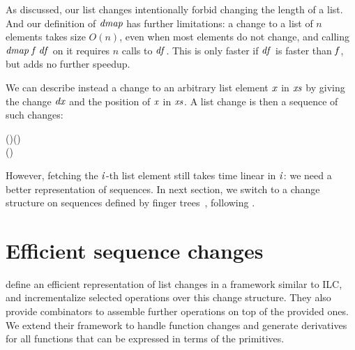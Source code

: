 As discussed, our list changes intentionally forbid changing the length of a list.
And our definition of \ensuremath{\Varid{dmap}} has further limitations: a change to a list of $n$
elements takes size $O(n)$, even when most elements do not change, and calling
\ensuremath{\Varid{dmap}\;\Varid{f}\;\Varid{df}} on it requires $n$ calls to \ensuremath{\Varid{df}}. This is only faster if \ensuremath{\Varid{df}} is
faster than \ensuremath{\Varid{f}}, but adds no further speedup.

We can describe instead a change to an arbitrary list element \ensuremath{\Varid{x}} in \ensuremath{\Varid{xs}} by
giving the change \ensuremath{\Varid{dx}} and the position of \ensuremath{\Varid{x}} in \ensuremath{\Varid{xs}}. A list change is then a
sequence of such changes:
\begin{hscode}\SaveRestoreHook
{}%
%
\>[B]{}\;\Delta (\;)\mathrel{=}\;(\;){}\<[E]%
\\
\>[B]{}\;\;\mathrel{=}\;\;(\Delta {}){}\<[E]%
\ColumnHook
\end{hscode}\resethooks
However, fetching the \ensuremath{\Varid{i}}-th list element still takes time linear in \ensuremath{\Varid{i}}: we
need a better representation of sequences. In next section, we switch to a change structure
on sequences defined by finger trees~\citep{hinze2006finger},
following \citet{Firsov2016purely}.

\section{Efficient sequence changes}
\citet{Firsov2016purely} define an efficient representation of list changes in a
framework similar to ILC, and incrementalize selected operations over this change
structure. They also provide combinators to assemble further operations on top
of the provided ones.
We extend their framework to handle function changes and generate derivatives
for all functions that can be expressed in terms of the primitives.

